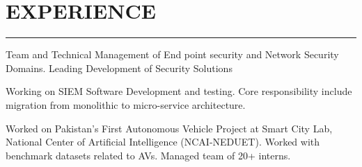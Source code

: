 \documentclass[9pt]{ShumailaAhmed-Resume}
\begin{document}
\begin{minipage}[t]{0.66\textwidth} 
\hspace*{0mm}\hfill \textbf{\href{}{}}

\section{\hspace{290pt} \large  EXPERIENCE}

\noindent\rule{12.5cm}{0.05mm}

\vspace{3pt}

 
\noindent
\hspace{5em}%
\begin{minipage}{0.85\textwidth\vspace{2pt}}
{\small Team and Technical Management of End point security and Network Security Domains. Leading Development of Security Solutions}\\
\end{minipage}

\vspace{5pt}

 
\noindent
\hspace{5em}%
\begin{minipage}{0.85\textwidth\vspace{2pt}}
{\small Working on SIEM Software Development and testing. Core responsibility include migration from monolithic to micro-service architecture.}\\
\end{minipage}

\vspace{5pt}

 
\noindent
\hspace{5em}%
\begin{minipage}{0.85\textwidth\vspace{3pt}}
{\small Worked on Pakistan's First Autonomous Vehicle Project at Smart City Lab, National Center of Artificial Intelligence (NCAI-NEDUET). Worked with benchmark datasets related to AVs. Managed team of 20+ interns.}\\
\end{minipage}


\end{minipage}
\end{document}
